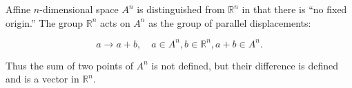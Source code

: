 Affine $n$-dimensional space $A^n$ is distinguished from $\mathbb{R}^n$ in that there is ``no fixed origin.'' The group $\mathbb{R}^n$ acts on $A^n$ as the group of parallel displacements:

$$a \rightarrow a + b, \quad a \in A^n, b \in \mathbb{R}^n, a + b \in A^n.$$

Thus the sum of two points of $A^n$ is not defined, but their difference is defined and is a vector in $\mathbb{R}^n$.
